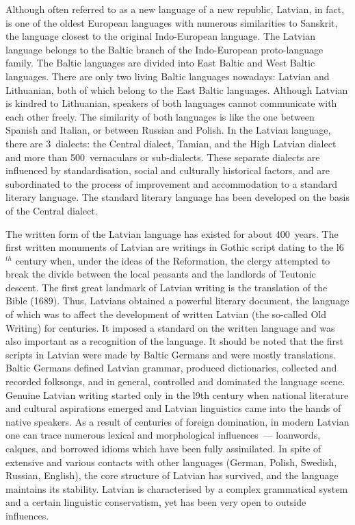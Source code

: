 \begin{multicols}{2}
Although often referred to as a new language of a new republic, Latvian, in fact, is one of the oldest European languages with numerous similarities to Sanskrit, the language closest to the original Indo-European language.
The Latvian language belongs to the Baltic branch of the Indo-European  proto-language family.
The Baltic languages are divided into East Baltic and West Baltic languages.
There are only two living Baltic languages nowadays: Latvian and Lithuanian, both of which belong to the East Baltic languages.
Although Latvian is kindred to Lithuanian, speakers of both languages cannot communicate with each other freely.
The similarity of both languages is like the one between Spanish and Italian, or between Russian and Polish.
In the Latvian language, there are 3~dialects: the Central dialect, Tamian, and the High Latvian dialect and more than 500~vernaculars or sub-dialects.
These separate dialects are influenced by standardisation, social and culturally historical factors, and are subordinated to the process of improvement and accommodation to a standard literary language.
The standard literary language has been developed on the basis of the Central dialect. 

The written form of the Latvian language has existed for about 400~years.
The first written monuments of Latvian are writings in Gothic script dating to the l6${}^{th}$ century when, under the ideas of the Reformation, the clergy attempted to break the divide between the local peasants and the landlords of Teutonic descent.
The first great landmark of Latvian writing is the translation of the Bible (1689).
Thus, Latvians obtained a powerful literary document, the language of which was to affect the development of written Latvian (the so-called Old Writing) for centuries.
It imposed a standard on the written language and was also important as a recognition of the language.
It should be noted that the first scripts in Latvian were made by Baltic Germans and were mostly translations.
Baltic Germans defined Latvian grammar, produced dictionaries, collected and recorded folksongs, and in general, controlled and dominated the language scene.
Genuine Latvian writing started only in the l9th century when national literature and cultural aspirations emerged and Latvian linguistics came into the hands of native speakers.
As a result of centuries of foreign domination, in modern Latvian one can trace numerous lexical and morphological influences~--- loanwords, calques, and borrowed idioms which have been fully assimilated.
In spite of extensive and various contacts with other languages (German, Polish, Swedish, Russian, English), the core structure of Latvian has survived, and the language maintains its stability.
Latvian is characterised by a complex grammatical system and a certain linguistic conservatism, yet has been very open to outside influences.


\end{multicols}
